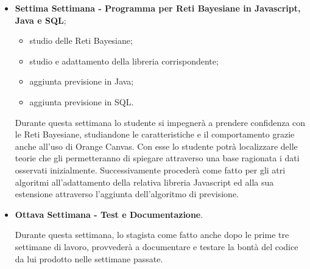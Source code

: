 \begin{itemize}
	\item \textbf{Settima Settimana - Programma per Reti Bayesiane in Javascript, Java e SQL};
\begin{itemize}
	\item studio delle Reti Bayesiane;
	\item studio e adattamento della libreria corrispondente;
	\item aggiunta previsione in Java;
	\item aggiunta previsione in SQL.
	\end{itemize}
	Durante questa settimana lo studente si impegnerà a prendere confidenza con le Reti Bayesiane, studiandone le caratteristiche e il comportamento grazie anche all'uso di Orange Canvas. Con esse lo studente potrà localizzare delle teorie che gli permetteranno di spiegare attraverso una base ragionata i dati osservati inizialmente. Successivamente procederà come fatto per gli atri algoritmi all'adattamento della relativa libreria Javascript ed alla sua estensione attraverso l'aggiunta dell'algoritmo di previsione.
	
	\item \textbf{Ottava Settimana - Test e Documentazione}.
	 \par Durante questa settimana, lo stagista come fatto anche dopo le prime tre settimane di lavoro, provvederà a documentare e testare la bontà del codice da lui prodotto nelle settimane passate.

\end{itemize}